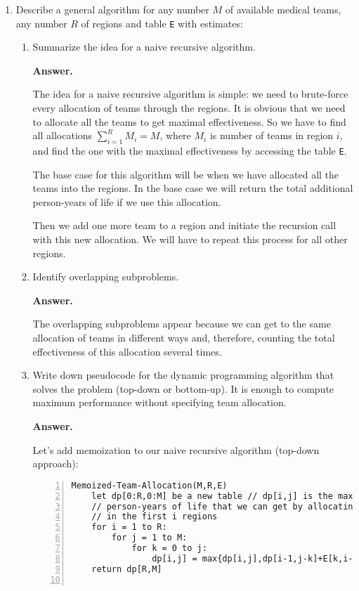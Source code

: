 \documentclass{article}
\begin{document}
\begin{enumerate}
    \item Describe a general algorithm for any number $M$ of available medical teams, any number $R$ of regions and table \texttt{E} with estimates:
    \begin{enumerate}
        \item Summarize the idea for a naive recursive algorithm.

        \textbf{Answer.}
        
        The idea for a naive recursive algorithm is simple: we need to brute-force every allocation of teams through the regions. It is obvious that we need to allocate all the teams to get maximal effectiveness. So we have to find all allocations $\sum_{i=1}^{R}M_i = M$, where $M_i$ is number of teams in region $i$, and find the one with the maximal effectiveness by accessing the table \texttt{E}.

        The base case for this algorithm will be when we have allocated all the teams into the regions. In the base case we will return the total additional person-years of life if we use this allocation.

        Then we add one more team to a region and initiate the recursion call with this new allocation. We will have to repeat this process for all other regions.
        
        \item Identify overlapping subproblems.

        \textbf{Answer.}

        The overlapping subproblems appear because we can get to the same allocation of teams in different ways and, therefore, counting the total effectiveness of this allocation several times.

        \item Write down pseudocode for the dynamic programming algorithm that solves the problem (top-down or bottom-up). It is enough to compute maximum performance without specifying team allocation.

        \textbf{Answer.}
        
        Let's add memoization to our naive recursive algorithm (top-down approach):
\begin{lstlisting}[numbers=left,language={},style=pseudo,mathescape=true,firstnumber=1]
Memoized-Team-Allocation(M,R,E)
    let dp[0:R,0:M] be a new table // dp[i,j] is the maximum additional
    // person-years of life that we can get by allocating j medical teams
    // in the first i regions
    for i = 1 to R:
        for j = 1 to M:
            for k = 0 to j:
                dp[i,j] = max{dp[i,j],dp[i-1,j-k]+E[k,i-1]}
    return dp[R,M]
    

\end{lstlisting}
\end{enumerate}
\end{enumerate}
\end{document}
